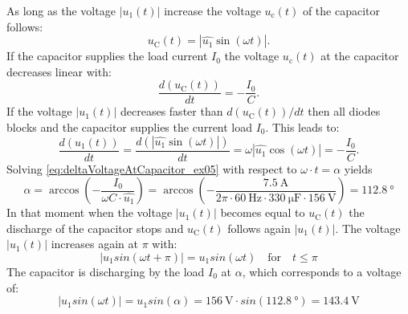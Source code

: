 \begin{solutionblock}
    As long as the voltage $\left| u_\mathrm{1}(t) \right|$ increase the voltage $u_\mathrm{c}(t)$ of the capacitor follows:
    \begin{equation} 
        u_\mathrm{C}(t) = \left| \hat{u_{\mathrm{1}}}\sin(\omega t)\right|.
    \end{equation}
    If the capacitor supplies the load current $I_\mathrm{0}$ the voltage $u_\mathrm{c}(t)$ at the capacitor 
    decreases linear with:
    \begin{equation} 
        \frac{d(u_\mathrm{C}(t))}{dt} = -\frac{I_\mathrm{0}}{C}.
    \end{equation} 
    If the voltage $\left| u_\mathrm{1}(t) \right|$ decreases faster than $d(u_\mathrm{C}(t))/dt$
    then all diodes blocks and the capacitor supplies the current load $I_\mathrm{0}$. This leads to:
    \begin{equation} 
        \frac{d(u_\mathrm{1}(t))}{dt} = \frac{d(\left| \hat{u_{\mathrm{1}}}\sin(\omega t)\right|)}{dt} 
        = \omega\left| \hat{u_{\mathrm{1}}}\cos(\omega t)\right| = -\frac{I_\mathrm{0}}{C}.
        \label{eq:deltaVoltageAtCapacitor_ex05}
    \end{equation} 
    Solving \eqref{eq:deltaVoltageAtCapacitor_ex05} with respect to $\omega \cdot t = \alpha$ yields
    \begin{equation}
        \alpha = \arccos(-\frac{I_\mathrm{0}}{\omega C \cdot \hat{u_{\mathrm{1}}}})
        = \arccos(-\frac{\SI{7.5}{\ampere}}{2 \pi \cdot \SI{60}{\hertz} \cdot \SI{330}{\micro\farad} \cdot \SI{156}{\volt}}) = \SI{112.8}{\degree}
    \end{equation}   
    In that moment when the voltage $\left| u_\mathrm{1}(t) \right|$ becomes equal to $u_\mathrm{C}(t)$ 
    the discharge of the capacitor stops and $u_\mathrm{C}(t)$ follows again $\left| u_\mathrm{1}(t) \right|$.
    The voltage $\left| u_\mathrm{1}(t) \right|$ increases again at $\pi$ with:
    \begin{equation}
        \left| u_\mathrm{1}sin(\omega t + \pi ) \right| = u_\mathrm{1}sin(\omega t) \quad \text{for} \quad t \leq \pi
    \end{equation}   
    The capacitor is discharging by the load  $I_\mathrm{0}$ at $\alpha$, which corresponds to a 
    voltage of: 
    \begin{equation}
        \left| u_\mathrm{1}sin(\omega t) \right| = u_\mathrm{1}sin(\alpha) 
        = \SI{156}{\volt} \cdot sin(\SI{112.8}{\degree})=\SI{143.4}{\volt}
    \end{equation}   

\end{solutionblock}

